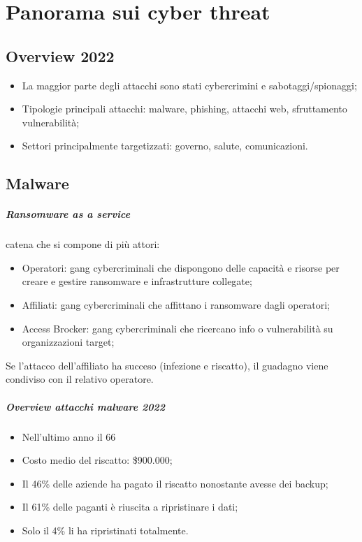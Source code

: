 \chapter{Panorama sui cyber threat}

\section{Overview 2022}
\begin{itemize}
    \item La maggior parte degli attacchi sono stati cybercrimini e sabotaggi/spionaggi;
    \item Tipologie principali attacchi: malware, phishing, attacchi web, sfruttamento vulnerabilità;
    \item Settori principalmente targetizzati: governo, salute, comunicazioni.
\end{itemize}

\section{Malware}
\paragraph{Ransomware as a service} catena che si compone di più attori:
\begin{itemize}
    \item Operatori: gang cybercriminali che dispongono delle capacità e risorse per creare e gestire ransomware e infrastrutture collegate;
    \item Affiliati: gang cybercriminali che affittano i ransomware dagli operatori;
    \item Access Brocker: gang cybercriminali che ricercano info o vulnerabilità su organizzazioni target;
\end{itemize}
Se l'attacco dell'affiliato ha succeso (infezione e riscatto), il guadagno viene condiviso con il relativo operatore.

\paragraph{Overview attacchi malware 2022}
\begin{itemize}
    \item Nell'ultimo anno il 66%
    \item Costo medio del riscatto: \$900.000;
    \item Il 46\% delle aziende ha pagato il riscatto nonostante avesse dei backup;
    \item Il 61\% delle paganti è riuscita a ripristinare i dati;
    \item Solo il 4\% li ha ripristinati totalmente.
\end{itemize}

